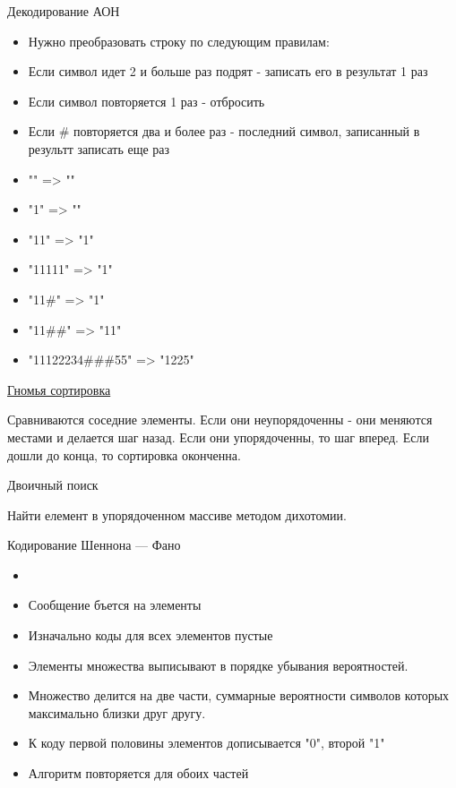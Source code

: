 \documentclass{article}
\begin{document}
\begin{center} Декодирование АОН \end{center}
\begin{itemize}
    \item Нужно преобразовать строку по следующим правилам:
    \item Если   символ идет 2 и больше раз подрят - записать его в результат 1 раз
    \item Если символ повторяется 1 раз - отбросить
    \item Если \# повторяется два и более раз - последний символ, записанный в результт записать еще раз
    \item "" => ""
    \item "1" => ""
    \item "11" => "1"
    \item "11111" => "1"
    \item "11\#" => "1"
    \item "11\#\#" => "11"
    \item "11122234\#\#\#55" => "1225"
\end{itemize}
\newpage

\begin{center}
\href{http://ru.wikipedia.org/wiki/%D0%93%D0%BD%D0%BE%D0%BC%D1%8C%D1%8F_%D1%81%D0%BE%D1%80%D1%82%D0%B8%D1%80%D0%BE%D0%B2%D0%BA%D0%B0}{Гномья сортировка}
\end{center}

Сравниваются соседние элементы. Если они неупорядоченны - они меняются местами и делается шаг назад.
Если они упорядоченны, то шаг вперед. Если дошли до конца, то сортировка оконченна.
\newpage

\begin{center} Двоичный поиск \end{center}
Найти елемент в упорядоченном массиве методом дихотомии.
\newpage

\begin{center} Кодирование Шеннона — Фано \end{center}
\begin{itemize}
    \item 
    \item Сообщение бъется на элементы
    \item Изначально коды для всех элементов пустые
    \item Элементы множества выписывают в порядке убывания вероятностей.
    \item Множество делится на две части, суммарные вероятности символов которых
            максимально близки друг другу.
    \item К коду первой половины элементов дописывается "0", второй "1"
    \item Алгоритм повторяется для обоих частей
\end{itemize}
\newpage
\end{document}
